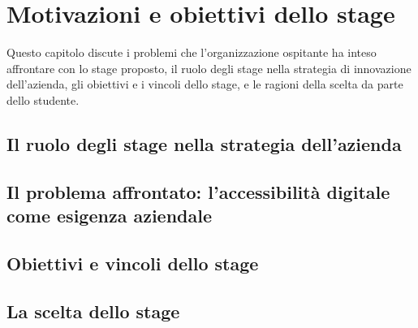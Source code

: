 \chapter{Motivazioni e obiettivi dello stage}
\label{chap:motivazioni-obiettivi}

Questo capitolo discute i problemi che l'organizzazione ospitante ha inteso affrontare con lo stage proposto, il ruolo degli stage nella strategia di innovazione dell'azienda, gli obiettivi e i vincoli dello stage, e le ragioni della scelta da parte dello studente.

\section{Il ruolo degli stage nella strategia dell'azienda}
\label{sec:ruolo-stage}




\section{Il problema affrontato: l'accessibilità digitale come esigenza aziendale}
\label{sec:problema-affrontato}




\section{Obiettivi e vincoli dello stage}
\label{sec:obiettivi-vincoli}




\section{La scelta dello stage}
\label{sec:scelta-stage}


